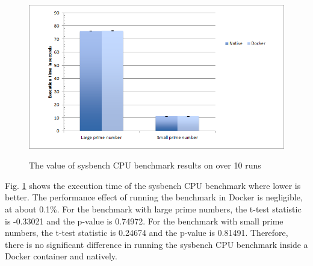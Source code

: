 \documentclass[11pt]{article}
\begin{document}
	
	\begin{figure}
		\centering
		{\includegraphics[width=150mm]{cpu.png}}
		\caption{ The value of sysbench CPU benchmark results on over 10 runs}
		\label{fig:cpu}
	\end{figure}
	
	Fig. \ref{fig:cpu} shows the execution time of the sysbench CPU benchmark where lower is better. The performance effect of running the benchmark in Docker is negligible, at about 0.1\%. For the benchmark with large prime numbers, the t-test statistic is -0.33021 and the p-value is 0.74972. For the benchmark with small prime numbers, the t-test statistic is 0.24674 and the p-value is 0.81491. Therefore, there is no significant difference in running the sysbench CPU benchmark inside a Docker container and natively.  
	
\end{document}
